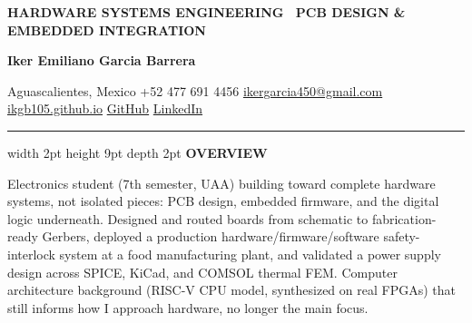 \documentclass[10pt]{extarticle}
\newcommand{\cvsection}[1]{%
  \vspace{4pt}
  {\color{accent}\vrule width 2pt height 9pt depth 2pt}\hspace{5pt}%
  {\color{primary}\bfseries\fontsize{10.5}{10.5}\selectfont\MakeUppercase{#1}}%
  \vspace{4pt}\par\vspace{2pt}
}
\begin{document}
{\color{accent}\bfseries\fontsize{10}{10}\selectfont\MakeUppercase{Hardware Systems Engineering \textbar\ PCB Design \& Embedded Integration}}\par
\vspace{2pt}
{\color{primary}\bfseries\fontsize{23}{23}\selectfont Iker Emiliano Garcia Barrera}\par
\vspace{1.5pt}
{\color{textlight}\fontsize{9.5}{9.5}\selectfont
Aguascalientes, Mexico \quad\textbullet\quad +52 477 691 4456 \quad\textbullet\quad
\href{mailto:ikergarcia450@gmail.com}{\color{secondary}ikergarcia450@gmail.com} \quad\textbullet\quad
\href{https://ikgb105.github.io}{\color{secondary}ikgb105.github.io} \quad\textbullet\quad
\href{https://github.com/IKGB105}{\color{secondary}GitHub} \quad\textbullet\quad
\href{https://www.linkedin.com/in/iker-emiliano-garc\%C3\%ADa-barrera-5775a33b9}{\color{secondary}LinkedIn}
}\par
\vspace{1.5pt}
{\color{secondary}\rule{\textwidth}{1.2pt}}
\vspace{2pt}

\cvsection{Overview}
{\fontsize{10}{13.5}\selectfont
Electronics student (7th semester, UAA) building toward complete hardware
systems, not isolated pieces: PCB design, embedded firmware, and the digital
logic underneath. Designed and routed boards from schematic to
fabrication-ready Gerbers, deployed a production hardware/firmware/software
safety-interlock system at a food manufacturing plant, and validated a power
supply design across SPICE, KiCad, and COMSOL thermal FEM. Computer
architecture background (RISC-V CPU model, synthesized on real FPGAs) that
still informs how I approach hardware, no longer the main focus.
}\par
\end{document}
